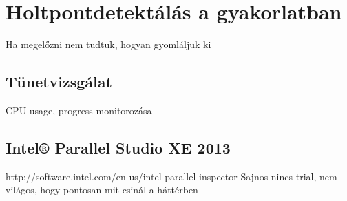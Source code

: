 \section{Holtpontdetektálás a gyakorlatban} Ha megelőzni nem tudtuk, hogyan gyomláljuk ki
    \subsection{Tünetvizsgálat} CPU usage, progress monitorozása
    \subsection{Intel® Parallel Studio XE 2013} http://software.intel.com/en-us/intel-parallel-inspector Sajnos nincs trial, nem világos, hogy pontosan mit csinál a háttérben
